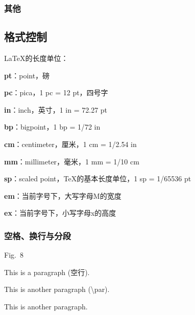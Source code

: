 \documentclass[twoside]{ctexart} %
\begin{document}
        \subsubsection{其他}
    
    \subsection{格式控制}
            \LaTeX 的长度单位：

            \textbf{pt}：point，磅

            \textbf{pc}：pica，1 pc = 12 pt，四号字

            \textbf{in}：inch，英寸，1 in = 72.27 pt

            \textbf{bp}：bigpoint，1 bp = 1/72 in

            \textbf{cm}：centimeter，厘米，1 cm = 1/2.54 in

            \textbf{mm}：millimeter，毫米，1 mm = 1/10 cm

            \textbf{sp}：scaled point，\TeX 的基本长度单位，1 sp = 1/65536 pt

            \textbf{em}：当前字号下，大写字母M的宽度

            \textbf{ex}：当前字号下，小写字母x的高度


        \subsubsection{空格、换行与分段}
            Fig.~8

            This is a paragraph (空行). 
            
            This is another paragraph (\textbackslash par). 
            \par This is another paragraph. 
\end{document}
